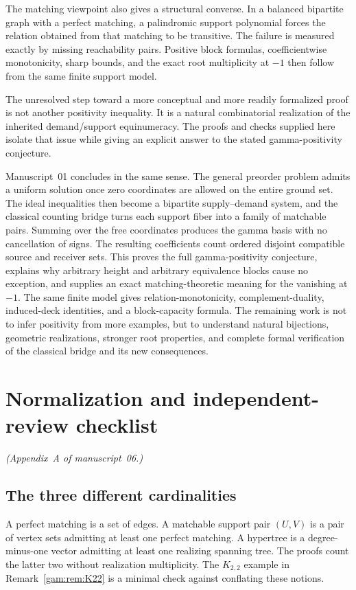 \documentclass[11pt]{article}
\numberwithin{equation}{section}
\theoremstyle{definition}
\begin{document}
The matching viewpoint also gives a structural converse. In a balanced
bipartite graph with a perfect matching, a palindromic support polynomial
forces the relation obtained from that matching to be transitive. The
failure is measured exactly by missing reachability pairs. Positive block
formulas, coefficientwise monotonicity, sharp bounds, and the exact root
multiplicity at $-1$ then follow from the same finite support model.

The unresolved step toward a more conceptual and more readily formalized
proof is not another positivity inequality. It is a natural combinatorial
realization of the inherited demand/support equinumeracy. The proofs and
checks supplied here isolate that issue while giving an explicit answer to
the stated gamma-positivity conjecture.

Manuscript~01 concludes in the same sense. The general preorder problem
admits a uniform solution once zero coordinates are allowed on the entire
ground set. The ideal inequalities then become a bipartite supply--demand
system, and the classical counting bridge turns each support fiber into a
family of matchable pairs. Summing over the free coordinates produces the
gamma basis with no cancellation of signs. The resulting coefficients count
ordered disjoint compatible source and receiver sets. This proves the full
gamma-positivity conjecture, explains why arbitrary height and arbitrary
equivalence blocks cause no exception, and supplies an exact
matching-theoretic meaning for the vanishing at $-1$. The same finite model
gives relation-monotonicity, complement-duality, induced-deck identities,
and a block-capacity formula. The remaining work is not to infer positivity
from more examples, but to understand natural bijections, geometric
realizations, stronger root properties, and complete formal verification of
the classical bridge and its new consequences.

\section{Normalization and independent-review checklist}\label{gam:sec:normalization}
\noindent\emph{(Appendix~A of manuscript~06.)}

\subsection{The three different cardinalities}
A perfect matching is a set of edges. A matchable support pair $(U,V)$ is a
pair of vertex sets admitting at least one perfect matching. A hypertree is
a degree-minus-one vector admitting at least one realizing spanning tree.
The proofs count the latter two without realization multiplicity. The
$K_{2,2}$ example in Remark~\ref{gam:rem:K22} is a minimal check against
conflating these notions.
\end{document}
